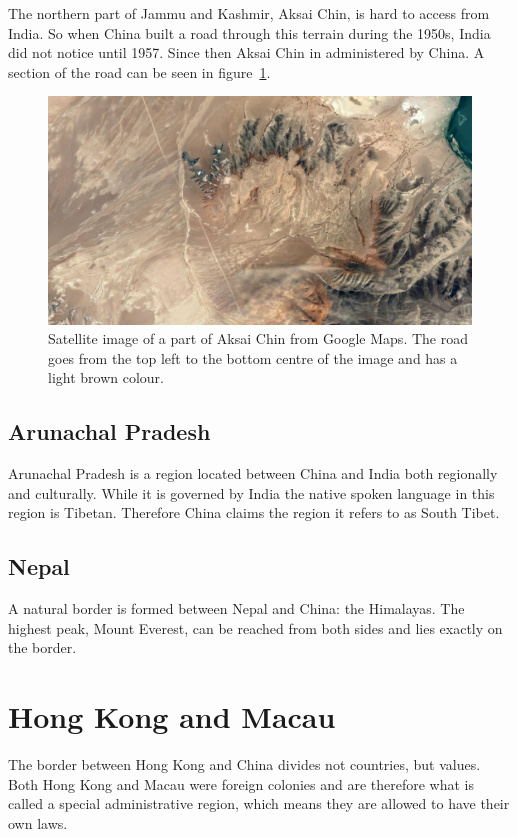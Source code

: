 \documentclass[conference]{IEEEtran}
\begin{document}
	The northern part of Jammu and Kashmir, Aksai Chin, is hard to access from India. So when China built a road through this terrain during the 1950s, India did not notice until 1957. Since then Aksai Chin in administered by China. A section of the road can be seen in figure~\ref{pic:india_jammuAndKashmir_road}.
	
	\begin{figure}[t]
	\centering
	\includegraphics[width=\linewidth]{img/india_jammuAndKashmir_road.png}
	\caption{Satellite image of a part of Aksai Chin from Google Maps. The road goes from the top left to the bottom centre of the image and has a light brown colour.}
	\label{pic:india_jammuAndKashmir_road}
	\end{figure}
	
	\subsection{Arunachal Pradesh}
	Arunachal Pradesh is a region located between China and India both regionally and culturally. While it is governed by India the native spoken language in this region is Tibetan. Therefore China claims the region it refers to as South Tibet.
	
	\subsection{Nepal}
	A natural border is formed between Nepal and China: the Himalayas. The highest peak, Mount Everest, can be reached from both sides and lies exactly on the border.
	
	\section{Hong Kong and Macau}
	The border between Hong Kong and China divides not countries, but values. Both Hong Kong and Macau were foreign colonies and are therefore what is called a special administrative region, which means they are allowed to have their own laws.
	
\end{document}
